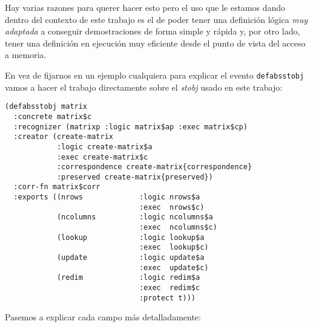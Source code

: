 \documentclass[a4paper,10pt]{article}
\begin{document}
\par \vspace{10pt}

Hay varias razones para querer hacer esto pero el uso que le estamos dando dentro del contexto de este trabajo es el de poder tener una definición lógica \emph{muy adaptada} a conseguir demostraciones de forma simple y rápida y, por otro lado, tener una definición en ejecución muy eficiente desde el punto de vista del acceso a memoria.

\par \vspace{10pt}

En vez de fijarnos en un ejemplo cualquiera para explicar el evento \texttt{defabsstobj} vamos a hacer el trabajo directamente sobre el \emph{stobj} usado en este trabajo:

\par \vspace{10pt}

\begin{lstlisting}[language=clips]
(defabsstobj matrix
  :concrete matrix$c
  :recognizer (matrixp :logic matrix$ap :exec matrix$cp)
  :creator (create-matrix
            :logic create-matrix$a 
            :exec create-matrix$c
            :correspondence create-matrix{correspondence}
            :preserved create-matrix{preserved})
  :corr-fn matrix$corr
  :exports ((nrows             :logic nrows$a
                               :exec  nrows$c)
            (ncolumns          :logic ncolumns$a
                               :exec  ncolumns$c)
            (lookup            :logic lookup$a
                               :exec  lookup$c)
            (update            :logic update$a
                               :exec  update$c)
            (redim             :logic redim$a
                               :exec  redim$c
                               :protect t)))
\end{lstlisting}

\par \vspace{10pt}

Pasemos a explicar cada campo más detalladamente:

\par \vspace{10pt}
\end{document}
